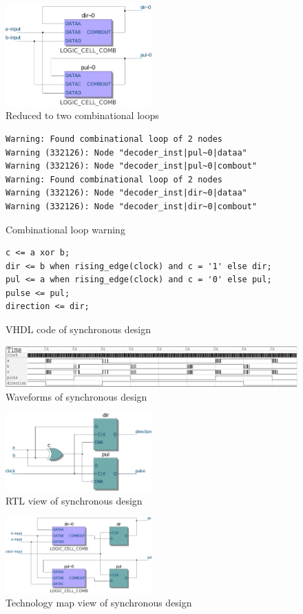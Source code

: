 \documentclass{article}
\begin{document}
\begin{figure}
\centering
\includegraphics[width=0.5\textwidth]{asynchronous_quadrature_decoder_quartus_map.pdf}
\caption{Reduced to two combinational loops}
\end{figure}
\begin{figure}
\centering
\begin{BVerbatim}
Warning: Found combinational loop of 2 nodes
Warning (332126): Node "decoder_inst|pul~0|dataa"
Warning (332126): Node "decoder_inst|pul~0|combout"
Warning: Found combinational loop of 2 nodes
Warning (332126): Node "decoder_inst|dir~0|dataa"
Warning (332126): Node "decoder_inst|dir~0|combout"
\end{BVerbatim}
\caption{Combinational loop warning}
\end{figure}
\begin{figure}
\centering
\begin{BVerbatim}
c <= a xor b;
dir <= b when rising_edge(clock) and c = '1' else dir;
pul <= a when rising_edge(clock) and c = '0' else pul;
pulse <= pul;
direction <= dir;
\end{BVerbatim}
\caption{VHDL code of synchronous design}
\end{figure}
\begin{figure}
\centering
\includegraphics[width=\textwidth]{quadrature_decoder_gtkwave.pdf}
\caption{Waveforms of synchronous design}
\end{figure}
\begin{figure}
\centering
\includegraphics[width=0.5\textwidth]{quadrature_decoder_quartus_rtl.pdf}
\caption{RTL view of synchronous design}
\end{figure}
\begin{figure}
\centering
\includegraphics[width=0.5\textwidth]{quadrature_decoder_quartus_map.pdf}
\caption{Technology map view of synchronous design}
\end{figure}
\end{document}
